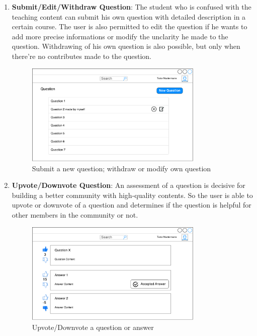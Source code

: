 \begin{enumerate}
\item
\textbf{Submit/Edit/Withdraw Question}: The student who is confused with the teaching content can submit his own question with detailed description in a certain course. The user is also permitted to edit the question if he wants to add more precise informations or modify the unclarity he made to the question. Withdrawing of his own question is also possible, but only when there're no contributes made to the question.

\begin{figure}[!htbp]
  \centering
    \includegraphics[width=0.8\textwidth]{Figures/mockup/New-question.pdf}
  \caption{Submit a new question; withdraw or modify own question}
\end{figure}

\item
\textbf{Upvote/Downvote Question}: An assessment of a question is decisive for building a better community with high-quality contents. So the user is able to upvote or downvote of a question and determines if the question is helpful for other members in the community or not.

\begin{figure}[!htbp]
  \centering
    \includegraphics[width=0.8\textwidth]{Figures/mockup/question-vote.pdf}
  \caption{Upvote/Downvote a question or answer}
\end{figure}


\end{enumerate}
